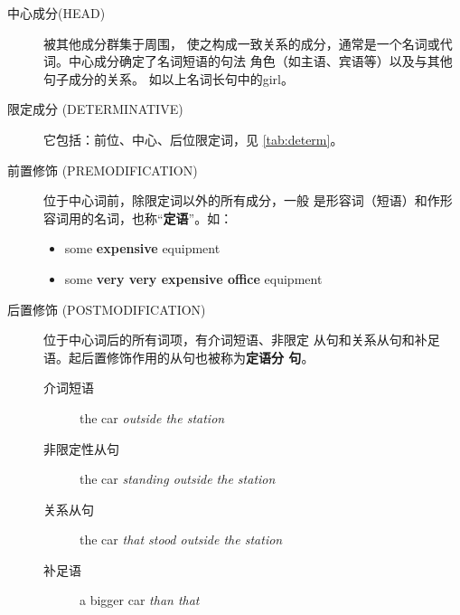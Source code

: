 \begin{description}
\item[中心成分(HEAD)] 被其他成分群集于周围，
  使之构成一致关系的成分，通常是一个名词或代词。中心成分确定了名词短语的句法
  角色（如主语、宾语等）以及与其他句子成分的关系。 如以上名词长句中的girl。

\item[限定成分 (DETERMINATIVE)] 它包括：前位、中心、后位限定词，见 \cref{tab:determ}。

\item[前置修饰 (PREMODIFICATION)] 位于中心词前，除限定词以外的所有成分，一般
  是形容词（短语）和作形容词用的名词，也称“\textbf{定语}”。如：
  \begin{itemize}
  \item some \textbf{expensive} equipment
  \item some \textbf{very very expensive office} equipment
  \end{itemize}

\item[后置修饰 (POSTMODIFICATION)] 位于中心词后的所有词项，有介词短语、非限定
  从句和关系从句和补足语。起后置修饰作用的从句也被称为\textbf{定语分
    句}。 
  \begin{description}
  \item[介词短语] the car \emph{outside the station}
  \item[非限定性从句] the car \emph{standing outside the station}
  \item[关系从句] the car \emph{that stood outside the station}
  \item[补足语] a bigger car \emph{than that}
  \end{description}

\end{description}

